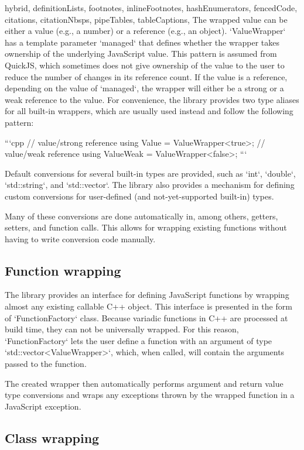 \begin{markdown*}{%
  hybrid,
  definitionLists,
  footnotes,
  inlineFootnotes,
  hashEnumerators,
  fencedCode,
  citations,
  citationNbsps,
  pipeTables,
  tableCaptions,
}
The wrapped value can be either a value (e.g., a number) or a reference (e.g., an object).
`ValueWrapper` has a template parameter `managed` that defines whether the wrapper takes ownership of the underlying JavaScript value. This pattern is assumed from QuickJS, which sometimes does not give ownership of the value to the user to reduce the number of changes in its reference count. If the value is a reference, depending on the value of `managed`, the wrapper will either be a strong or a weak reference to the value. For convenience, the library provides two type aliases for all built-in wrappers, which are usually used instead and follow the following pattern:

```cpp
// value/strong reference
using Value = ValueWrapper<true>;
// value/weak reference
using ValueWeak = ValueWrapper<false>;
```

Default conversions for several built-in types are provided, such as `int`, `double`, `std::string`, and `std::vector`. The library also provides a mechanism for defining custom conversions for user-defined (and not-yet-supported built-in) types.

Many of these conversions are done automatically in, among others, getters, setters, and function calls. This allows for wrapping existing functions without having to write conversion code manually.

\subsection{Function wrapping}

The library provides an interface for defining JavaScript functions by wrapping almost any existing callable C++ object. This interface is presented in the form of `FunctionFactory` class. Because variadic functions in C++ are processed at build time, they can not be universally wrapped. For this reason, `FunctionFactory` lets the user define a function with an argument of type `std::vector<ValueWrapper>`, which, when called, will contain the arguments passed to the function.

The created wrapper then automatically performs argument and return value type conversions and wraps any exceptions thrown by the wrapped function in a JavaScript exception.

\subsection{Class wrapping}


\end{markdown*}
